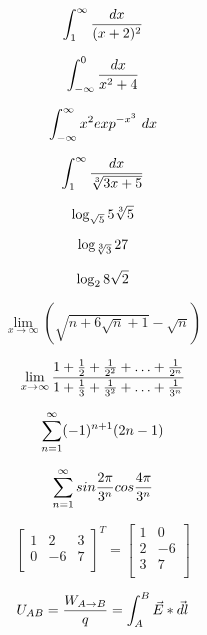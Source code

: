 \documentclass[12pt, letterpaper, titlepage]{article}
\begin{document}
$$
\int_{1}^\infty \frac{dx}{(x+2)^2} \\
$$

$$
\int_{-\infty}^0 \frac{dx}{x^2+4} \\
$$

$$
\int_{-\infty}^\infty x^2 exp^{-x^3} \ dx \\
$$

$$
\int_{1}^\infty \frac{dx}{\sqrt[3]{3x+5}} \\
$$

$$
\log_{\sqrt{5}}5\sqrt[3]{5} \\
$$

$$
\log_{\sqrt[3]{3}}27 \\
$$

$$
\log_{2}8\sqrt{2} \\
$$

$$
\lim_{x \rightarrow \infty} \left(\sqrt{n+6\sqrt{n}+1} - \sqrt{n}\right)
$$

$$
\lim_{x \rightarrow \infty} \frac{1+\frac{1}{2}+\frac{1}{2^2}+\ldots+\frac{1}{2^n}}{1+\frac{1}{3}+\frac{1}{3^2}+\ldots+\frac{1}{3^n}} \\
$$

$$
\sum_{n=1}^\infty (-1)^{n+1}(2n-1) \\
$$

$$
\sum_{n=1}^\infty sin\frac{2\pi}{3^n}cos\frac{4\pi}{3^n} \\
$$

$$
\left[ \begin{array}{lll}
1 & 2 & 3 \\
0 & -6 & 7 \\
\end{array} \right]^T
=
\left[ \begin{array}{ll}
1 & 0 \\
2 & -6 \\
3 & 7 \\
\end{array} \right]
$$

$$
U_{AB} = \frac{W_{A\rightarrow B}}{q} = \int_{A}^B \vec{E} * \vec{dl} \\
$$
\end{document}
